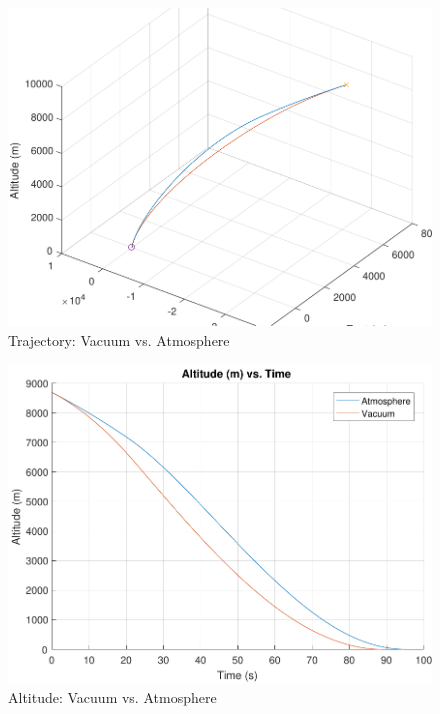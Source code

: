 \begin{figure}[H]
	\centering
	\begin{minipage}{4.5 in}
		\includegraphics[width=\linewidth]{Figures/trajatmovsvac.pdf}
		\caption{Trajectory: Vacuum vs. Atmosphere \label{fig:trajatmovsvac} }
	\end{minipage}
\end{figure}

\begin{figure}[H]
	\centering
	\begin{minipage}{4.5 in}
		\includegraphics[width=\linewidth]{Figures/altatmovsvac.pdf}
		\caption{Altitude: Vacuum vs. Atmosphere \label{fig:altatmovsvac} }
	\end{minipage}
\end{figure}

